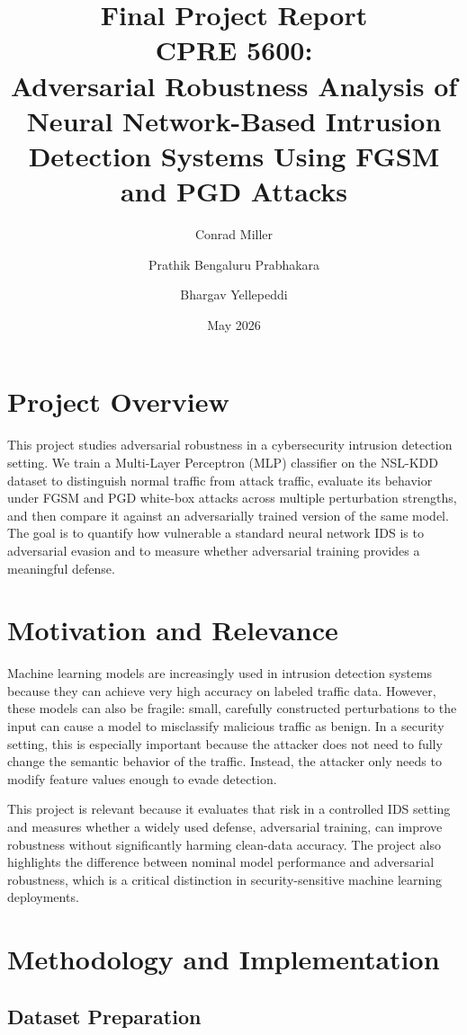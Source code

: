 \documentclass[11pt]{article}
\title{Final Project Report \\
CPRE 5600:\\
Adversarial Robustness Analysis of Neural Network-Based Intrusion Detection Systems Using FGSM and PGD Attacks}
\author{Conrad Miller \and Prathik Bengaluru Prabhakara \and Bhargav Yellepeddi}
\date{May 2026}
\begin{document}
\maketitle

\section{Project Overview}

This project studies adversarial robustness in a cybersecurity intrusion detection setting. We train a Multi-Layer Perceptron (MLP) classifier on the NSL-KDD dataset to distinguish normal traffic from attack traffic, evaluate its behavior under FGSM and PGD white-box attacks across multiple perturbation strengths, and then compare it against an adversarially trained version of the same model. The goal is to quantify how vulnerable a standard neural network IDS is to adversarial evasion and to measure whether adversarial training provides a meaningful defense.

\section{Motivation and Relevance}

Machine learning models are increasingly used in intrusion detection systems because they can achieve very high accuracy on labeled traffic data. However, these models can also be fragile: small, carefully constructed perturbations to the input can cause a model to misclassify malicious traffic as benign. In a security setting, this is especially important because the attacker does not need to fully change the semantic behavior of the traffic. Instead, the attacker only needs to modify feature values enough to evade detection.

This project is relevant because it evaluates that risk in a controlled IDS setting and measures whether a widely used defense, adversarial training, can improve robustness without significantly harming clean-data accuracy. The project also highlights the difference between nominal model performance and adversarial robustness, which is a critical distinction in security-sensitive machine learning deployments.

\section{Methodology and Implementation}

\subsection{Dataset Preparation}
\end{document}

